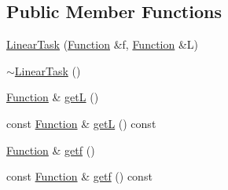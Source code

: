 \subsection*{Public Member Functions}
\begin{DoxyCompactItemize}
\item 
\hyperlink{classocra_1_1LinearTask_a6bbf60a2fde8bd52c79d3d26613f06a0}{Linear\+Task} (\hyperlink{classocra_1_1Function}{Function} \&f, \hyperlink{classocra_1_1Function}{Function} \&L)
\item 
\hyperlink{classocra_1_1LinearTask_ad443b3044cc66e3e68ea3f5062e37453}{$\sim$\+Linear\+Task} ()
\item 
\hyperlink{classocra_1_1Function}{Function} \& \hyperlink{classocra_1_1LinearTask_a84dc8ca9c882d3e1b864e78784814303}{getL} ()
\item 
const \hyperlink{classocra_1_1Function}{Function} \& \hyperlink{classocra_1_1LinearTask_acfca060d834f7141863d5f3d254d6c66}{getL} () const
\item 
\hyperlink{classocra_1_1Function}{Function} \& \hyperlink{classocra_1_1LinearTask_a64b0390b8b65bcd5a533c0b6774615ec}{getf} ()
\item 
const \hyperlink{classocra_1_1Function}{Function} \& \hyperlink{classocra_1_1LinearTask_a19be592ae8046225f171a54c01d40583}{getf} () const
\end{DoxyCompactItemize}
